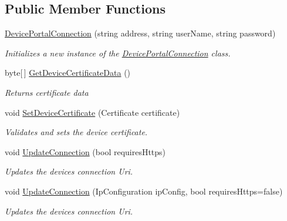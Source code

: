 \subsection*{Public Member Functions}
\begin{DoxyCompactItemize}
\item 
\hyperlink{class_test_app_h_l_1_1_universal_windows_1_1_device_portal_connection_ab31696c121129b7d6705aeff143662ea}{Device\+Portal\+Connection} (string address, string user\+Name, string password)
\begin{DoxyCompactList}\small\item\em Initializes a new instance of the \hyperlink{class_test_app_h_l_1_1_universal_windows_1_1_device_portal_connection}{Device\+Portal\+Connection} class. \end{DoxyCompactList}\item 
byte\mbox{[}$\,$\mbox{]} \hyperlink{class_test_app_h_l_1_1_universal_windows_1_1_device_portal_connection_a0f194d64d0f920f6e576da0b922deecd}{Get\+Device\+Certificate\+Data} ()
\begin{DoxyCompactList}\small\item\em Returns certificate data \end{DoxyCompactList}\item 
void \hyperlink{class_test_app_h_l_1_1_universal_windows_1_1_device_portal_connection_aae258f7c1ac08450951c3614e5a16397}{Set\+Device\+Certificate} (Certificate certificate)
\begin{DoxyCompactList}\small\item\em Validates and sets the device certificate. \end{DoxyCompactList}\item 
void \hyperlink{class_test_app_h_l_1_1_universal_windows_1_1_device_portal_connection_af17a7574cec6899ea2a609edcae07993}{Update\+Connection} (bool requires\+Https)
\begin{DoxyCompactList}\small\item\em Updates the device\textquotesingle{}s connection Uri. \end{DoxyCompactList}\item 
void \hyperlink{class_test_app_h_l_1_1_universal_windows_1_1_device_portal_connection_ab60a740953027435f5584a18bb73e057}{Update\+Connection} (Ip\+Configuration ip\+Config, bool requires\+Https=false)
\begin{DoxyCompactList}\small\item\em Updates the device\textquotesingle{}s connection Uri. \end{DoxyCompactList}\end{DoxyCompactItemize}
